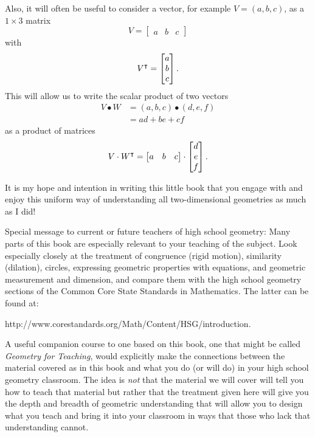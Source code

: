 \documentclass{ximera}
\begin{document}
Also, it will often be useful to consider a vector, for example
$V=\left(a,b,c\right)$, as a $1\times3$ matrix
\[
V=
\begin{bmatrix}
a & b & c
\end{bmatrix}
\]
with
\[
V^\intercal  =
\begin{bmatrix}
a\\
b\\
c
\end{bmatrix}.
\]
This will allow us to write the scalar product of two vectors%
\begin{align*}
V\bullet W  &  =\left(  a,b,c\right)  \bullet\left(d,e,f\right) \\
&  =ad+be+cf%
\end{align*}
as a product of matrices%
\[
V\cdot W^\intercal=
\begin{bmatrix}
a & b & c
\end{bmatrix} 
\cdot
\begin{bmatrix}
d\\
e\\
f
\end{bmatrix}.
\]


It is my hope and intention in writing this little book that you engage with
and enjoy this uniform way of understanding all two-dimensional geometries as
much as I did!

\begin{remark}
Special message to current or future teachers of high school geometry:
Many parts of this book are especially relevant to your teaching of
the subject. Look especially closely at the treatment of congruence
(rigid motion), similarity (dilation), circles, expressing geometric
properties with equations, and geometric measurement and dimension,
and compare them with the high school geometry sections of the Common
Core State Standards in Mathematics. The latter can be found at:
\end{remark}

\begin{center}
http://www.corestandards.org/Math/Content/HSG/introduction.
\end{center}

A useful companion course to one based on this book, one that might be
called \textit{Geometry for Teaching}, would explicitly make the
connections between the material covered as in this book and what you
do (or will do) in your high school geometry classroom. The idea is
\textit{not} that the material we will cover will tell you how to
teach that material but rather that the treatment given here will give
you the depth and breadth of geometric understanding that will allow
you to design what you teach and bring it into your classroom in ways
that those who lack that understanding cannot.
\end{document}
